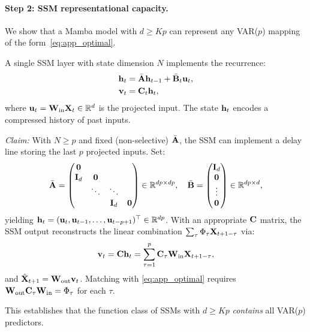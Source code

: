 \paragraph{Step 2: SSM representational capacity.}
We show that a Mamba model with $d \geq Kp$ can represent any
VAR($p$) mapping of the form~\eqref{eq:app_optimal}.

A single SSM layer with state dimension $N$ implements the recurrence:
\begin{align}
    \mathbf{h}_t &= \bar{\mathbf{A}} \mathbf{h}_{t-1} + \bar{\mathbf{B}}_t \mathbf{u}_t, \\
    \mathbf{v}_t &= \mathbf{C}_t \mathbf{h}_t,
\end{align}
where $\mathbf{u}_t = \mathbf{W}_{\text{in}} \mathbf{X}_t \in \mathbb{R}^d$ is the projected
input. The state $\mathbf{h}_t$ encodes a compressed history of past inputs.

\emph{Claim:} With $N \geq p$ and fixed (non-selective) $\bar{\mathbf{A}}$, the
SSM can implement a delay line storing the last $p$ projected inputs. Set:
\begin{equation}
    \bar{\mathbf{A}} = \begin{pmatrix}
        \mathbf{0} & & & \\
        \mathbf{I}_d & \mathbf{0} & & \\
        & \ddots & \ddots & \\
        & & \mathbf{I}_d & \mathbf{0}
    \end{pmatrix} \in \mathbb{R}^{dp \times dp}, \quad
    \bar{\mathbf{B}} = \begin{pmatrix} \mathbf{I}_d \\ \mathbf{0} \\
    \vdots \\ \mathbf{0} \end{pmatrix} \in \mathbb{R}^{dp \times d},
\end{equation}
yielding $\mathbf{h}_t = (\mathbf{u}_t, \mathbf{u}_{t-1}, \ldots,
\mathbf{u}_{t-p+1})^\top \in \mathbb{R}^{dp}$. With an appropriate $\mathbf{C}$
matrix, the SSM output reconstructs the linear combination
$\sum_\tau \Phi_\tau \mathbf{X}_{t+1-\tau}$ via:
\begin{equation}
    \mathbf{v}_t = \mathbf{C} \mathbf{h}_t = \sum_{\tau=1}^{p} \mathbf{C}_\tau
    \mathbf{W}_{\text{in}} \mathbf{X}_{t+1-\tau},
\end{equation}
and $\hat{\mathbf{X}}_{t+1} = \mathbf{W}_{\text{out}} \mathbf{v}_t$. Matching with
\eqref{eq:app_optimal} requires $\mathbf{W}_{\text{out}} \mathbf{C}_\tau
\mathbf{W}_{\text{in}} = \Phi_\tau$ for each $\tau$.

This establishes that the function class of SSMs with $d \geq Kp$
\emph{contains} all VAR($p$) predictors.

